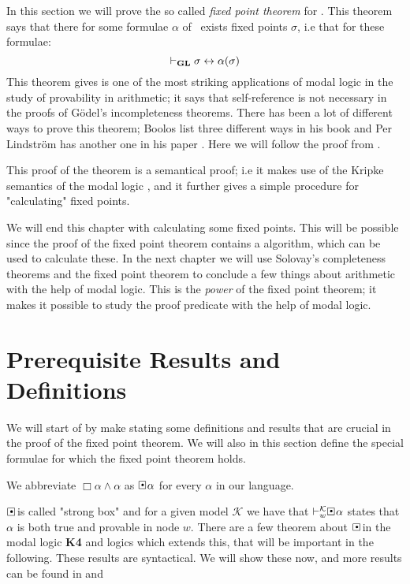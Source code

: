 \documentclass[../main.tex]{subfiles}
\begin{document}
In this section we will prove the so called \textit{fixed point theorem} for
\GL.  This theorem says that there for some formulae $\alpha$  of \GL\ exists fixed
points $\sigma$, i.e that for these formulae:
\[\vdash_{\text{\textbf{GL}}}\sigma\leftrightarrow\alpha(\sigma)\]
This theorem gives is one of the most striking applications of modal logic in
the study of provability in arithmetic; it says that self-reference is not
necessary in the proofs of Gödel's incompleteness theorems.
There has been a lot of different ways to prove this theorem; Boolos
list three different ways in his book \parencite{Boolos1993} and Per Lindström has
another one in his paper \parencite{Lind1996}. Here we
will follow the proof from \parencite{Olson1990}.

This proof of the theorem is a semantical proof; i.e it makes use of the
Kripke semantics of the modal logic \GL, and it further gives a simple
procedure for "calculating" fixed points.

We will end this chapter with calculating some fixed points. This will be
possible since the proof of the fixed point theorem contains a algorithm,
which can be used to calculate these. In the next chapter we will use Solovay's
completeness theorems and the fixed point theorem to conclude a few things
about arithmetic with the help of modal logic. This is the \textit{power} of
the fixed point theorem; it makes it possible to study the proof predicate with
the help of modal logic.

\section{Prerequisite Results and Definitions}

We will start of by make stating some definitions and results that are crucial
in the proof of the fixed point theorem. We will also in this section define
the special formulae for which the fixed point theorem holds.

\begin{defi}
	We abbreviate $\Box\alpha\wedge\alpha$ as $\sBox\alpha$ for every
	$\alpha$ in our language.
\end{defi}
$\sBox$ is called "strong box" and for a given model $\mathcal{K}$ we have that
$\vdash_w^\mathcal{K}\sBox \alpha$ states that $\alpha$ is both true and
provable in node $w$. There are a few theorem about $\sBox$ in the modal logic
\textbf{K4} and logics which extends this, that will be
important in the following. These results are syntactical. We will show these
now, and more results can be found in \parencite{Smor1985} and \parencite{Boolos1993}
\end{document}

